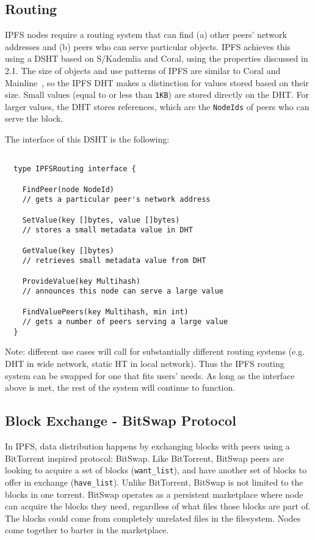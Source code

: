 \documentclass{sig-alternate}
\begin{document}
\subsection{Routing}

IPFS nodes require a routing system that can find (a) other peers' network addresses and (b) peers who can serve particular objects. IPFS achieves this using a DSHT based on S/Kademlia and Coral, using the properties discussed in 2.1. The size of objects and use patterns of IPFS are similar to Coral \cite{freedman04} and Mainline~\cite{wang13}, so the IPFS DHT makes a distinction for values stored based on their size. Small values (equal to or less than \texttt{1KB}) are stored directly on the DHT. For larger values, the DHT stores references, which are the \texttt{NodeIds} of peers who can serve the block.

The interface of this DSHT is the following:

\begin{verbatim}

  type IPFSRouting interface {

    FindPeer(node NodeId)
    // gets a particular peer's network address

    SetValue(key []bytes, value []bytes)
    // stores a small metadata value in DHT

    GetValue(key []bytes)
    // retrieves small metadata value from DHT

    ProvideValue(key Multihash)
    // announces this node can serve a large value

    FindValuePeers(key Multihash, min int)
    // gets a number of peers serving a large value
  }
\end{verbatim}

Note: different use cases will call for substantially different routing systems (e.g. DHT in wide network, static HT in local network). Thus the IPFS routing system can be swapped for one that fits users' needs. As long as the interface above is met, the rest of the system will continue to function.

\subsection{Block Exchange - BitSwap Protocol}

In IPFS, data distribution happens by exchanging blocks with peers using a
BitTorrent inspired protocol: BitSwap. Like BitTorrent, BitSwap peers are
looking to acquire a set of blocks (\texttt{want\_list}), and have another set
of blocks to offer in exchange (\texttt{have\_list}).
Unlike BitTorrent, BitSwap is not limited to the blocks in one torrent.
BitSwap operates as a persistent marketplace where node can acquire the
blocks they need, regardless of what files those blocks are part of. The
blocks could come from completely unrelated files in the filesystem.
Nodes come together to barter in the marketplace.
\end{document}
